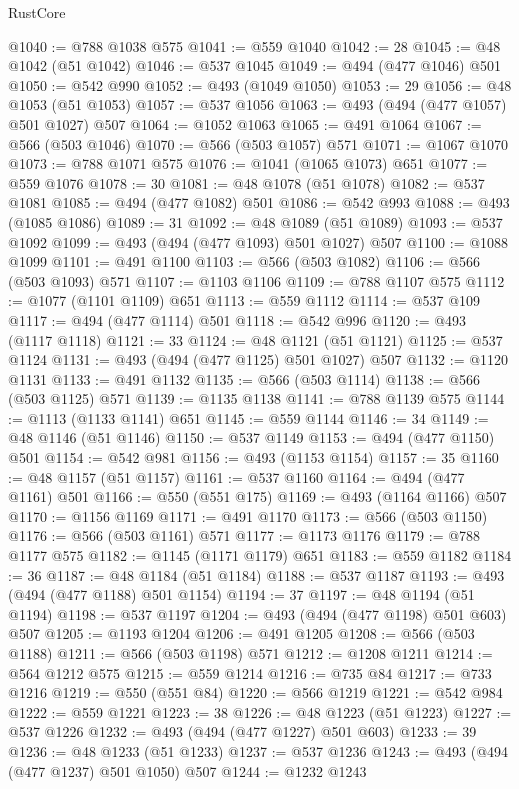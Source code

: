 \begin{lexlean}{RustCore}
\begin{coremodule}
@1040 := @788 @1038 @575
@1041 := @559 @1040
@1042 := 28
@1045 := @48 @1042 (@51 @1042)
@1046 := @537 @1045
@1049 := @494 (@477 @1046) @501
@1050 := @542 @990
@1052 := @493 (@1049 @1050)
@1053 := 29
@1056 := @48 @1053 (@51 @1053)
@1057 := @537 @1056
@1063 := @493 (@494 (@477 @1057) @501 @1027) @507
@1064 := @1052 @1063
@1065 := @491 @1064
@1067 := @566 (@503 @1046)
@1070 := @566 (@503 @1057) @571
@1071 := @1067 @1070
@1073 := @788 @1071 @575
@1076 := @1041 (@1065 @1073) @651
@1077 := @559 @1076
@1078 := 30
@1081 := @48 @1078 (@51 @1078)
@1082 := @537 @1081
@1085 := @494 (@477 @1082) @501
@1086 := @542 @993
@1088 := @493 (@1085 @1086)
@1089 := 31
@1092 := @48 @1089 (@51 @1089)
@1093 := @537 @1092
@1099 := @493 (@494 (@477 @1093) @501 @1027) @507
@1100 := @1088 @1099
@1101 := @491 @1100
@1103 := @566 (@503 @1082)
@1106 := @566 (@503 @1093) @571
@1107 := @1103 @1106
@1109 := @788 @1107 @575
@1112 := @1077 (@1101 @1109) @651
@1113 := @559 @1112
@1114 := @537 @109
@1117 := @494 (@477 @1114) @501
@1118 := @542 @996
@1120 := @493 (@1117 @1118)
@1121 := 33
@1124 := @48 @1121 (@51 @1121)
@1125 := @537 @1124
@1131 := @493 (@494 (@477 @1125) @501 @1027) @507
@1132 := @1120 @1131
@1133 := @491 @1132
@1135 := @566 (@503 @1114)
@1138 := @566 (@503 @1125) @571
@1139 := @1135 @1138
@1141 := @788 @1139 @575
@1144 := @1113 (@1133 @1141) @651
@1145 := @559 @1144
@1146 := 34
@1149 := @48 @1146 (@51 @1146)
@1150 := @537 @1149
@1153 := @494 (@477 @1150) @501
@1154 := @542 @981
@1156 := @493 (@1153 @1154)
@1157 := 35
@1160 := @48 @1157 (@51 @1157)
@1161 := @537 @1160
@1164 := @494 (@477 @1161) @501
@1166 := @550 (@551 @175)
@1169 := @493 (@1164 @1166) @507
@1170 := @1156 @1169
@1171 := @491 @1170
@1173 := @566 (@503 @1150)
@1176 := @566 (@503 @1161) @571
@1177 := @1173 @1176
@1179 := @788 @1177 @575
@1182 := @1145 (@1171 @1179) @651
@1183 := @559 @1182
@1184 := 36
@1187 := @48 @1184 (@51 @1184)
@1188 := @537 @1187
@1193 := @493 (@494 (@477 @1188) @501 @1154)
@1194 := 37
@1197 := @48 @1194 (@51 @1194)
@1198 := @537 @1197
@1204 := @493 (@494 (@477 @1198) @501 @603) @507
@1205 := @1193 @1204
@1206 := @491 @1205
@1208 := @566 (@503 @1188)
@1211 := @566 (@503 @1198) @571
@1212 := @1208 @1211
@1214 := @564 @1212 @575
@1215 := @559 @1214
@1216 := @735 @84
@1217 := @733 @1216
@1219 := @550 (@551 @84)
@1220 := @566 @1219
@1221 := @542 @984
@1222 := @559 @1221
@1223 := 38
@1226 := @48 @1223 (@51 @1223)
@1227 := @537 @1226
@1232 := @493 (@494 (@477 @1227) @501 @603)
@1233 := 39
@1236 := @48 @1233 (@51 @1233)
@1237 := @537 @1236
@1243 := @493 (@494 (@477 @1237) @501 @1050) @507
@1244 := @1232 @1243

\end{coremodule}
\end{lexlean}
